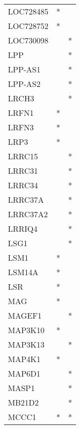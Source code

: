 \begin{longtable}{lcc}
LOC728485        &              * &            \\
LOC728752        &              * &            \\
LOC730098        &                &          * \\
LPP              &                &          * \\
LPP-AS1          &                &          * \\
LPP-AS2          &                &          * \\
LRCH3            &                &          * \\
LRFN1            &              * &            \\
LRFN3            &              * &            \\
LRP3             &              * &            \\
LRRC15           &                &          * \\
LRRC31           &                &          * \\
LRRC34           &                &          * \\
LRRC37A          &                &          * \\
LRRC37A2         &                &          * \\
LRRIQ4           &                &          * \\
LSG1             &                &          * \\
LSM1             &              * &            \\
LSM14A           &              * &            \\
LSR              &              * &            \\
MAG              &              * &            \\
MAGEF1           &                &          * \\
MAP3K10          &              * &            \\
MAP3K13          &                &          * \\
MAP4K1           &              * &            \\
MAP6D1           &                &          * \\
MASP1            &                &          * \\
MB21D2           &                &          * \\
MCCC1            &              * &          * \\

\end{longtable}
